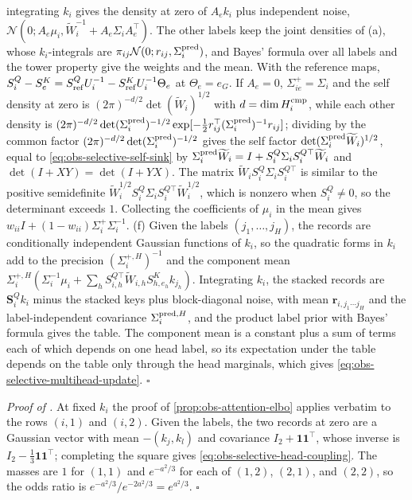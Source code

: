 integrating \(k_i\) gives the density at zero of \(A_ek_i\) plus independent
noise, \(\mathcal N(0;A_e\mu_i,\widetilde W_i^{-1}+A_e\Sigma_i A_e^\top)\). The
other labels keep the joint densities of (a), whose \(k_i\)-integrals are
\(\pi_{ij}\mathcal N(0;r_{ij},\Sigma_i^{\rm pred})\), and Bayes' formula over
all labels and the tower property give the weights and the mean. With the
reference maps, \(S^Q_i-S^K_e=S^Q_{\rm ref}U_i^{-1}-S^K_{\rm ref}U_i^{-1}\Theta_e\)
at \(\Theta_e=e_G\). If \(A_e=0\), \(\Sigma_{ie}^+=\Sigma_i\) and the self
density at zero is \((2\pi)^{-d/2}\det(\widetilde W_i)^{1/2}\) with
\(d=\dim H_i^{\rm cmp}\), while each other density is
\((2\pi)^{-d/2}\det(\Sigma_i^{\rm pred})^{-1/2}\exp[-\frac12r_{ij}^\top
(\Sigma_i^{\rm pred})^{-1}r_{ij}]\); dividing by the common factor
\((2\pi)^{-d/2}\det(\Sigma_i^{\rm pred})^{-1/2}\) gives the self factor
\(\det(\Sigma_i^{\rm pred}\widetilde W_i)^{1/2}\), equal to
\eqref{eq:obs-selective-self-sink} by
\(\Sigma_i^{\rm pred}\widetilde W_i=I+S^Q_i\Sigma_iS_i^{Q\top}\widetilde W_i\) and
\(\det(I+XY)=\det(I+YX)\). The matrix \(\widetilde W_iS^Q_i\Sigma_iS_i^{Q\top}\)
is similar to the positive semidefinite
\(\widetilde W_i^{1/2}S^Q_i\Sigma_iS_i^{Q\top}\widetilde W_i^{1/2}\), which is
nonzero when \(S^Q_i\ne0\), so the determinant exceeds \(1\). Collecting the
coefficients of \(\mu_i\) in the mean gives
\(w_{ii}I+(1-w_{ii})\Sigma_i^+\Sigma_i^{-1}\).
(f) Given the labels \((j_1,\ldots,j_H)\), the records are conditionally
independent Gaussian functions of \(k_i\), so the quadratic forms in \(k_i\)
add to the precision \((\Sigma_i^{+,H})^{-1}\) and the component mean
\(\Sigma_i^{+,H}(\Sigma_i^{-1}\mu_i+\sum_hS_{i,h}^{Q\top}\widetilde W_{i,h}
S^K_{h,e_h}k_{j_h})\). Integrating \(k_i\), the stacked records are
\(\mathbf S^Q_ik_i\) minus the stacked keys plus block-diagonal noise, with
mean \(\mathbf r_{i,j_1\cdots j_H}\) and the label-independent covariance
\(\Sigma_i^{{\rm pred},H}\), and the product label prior with Bayes' formula
gives the table. The component mean is a constant plus a sum of terms each of
which depends on one head label, so its expectation under the table depends on
the table only through the head marginals, which gives
\eqref{eq:obs-selective-multihead-update}. \(\square\)

\noindent\emph{Proof of .}
At fixed \(k_i\) the proof of \cref{prop:obs-attention-elbo} applies verbatim
to the rows \((i,1)\) and \((i,2)\). Given the labels, the two records at zero
are a Gaussian vector with mean \(-(k_j,k_l)\) and covariance
\(I_2+\mathbf 1\mathbf 1^\top\), whose inverse is
\(I_2-\frac13\mathbf 1\mathbf 1^\top\); completing the square gives
\eqref{eq:obs-selective-head-coupling}. The masses are \(1\) for \((1,1)\) and
\(e^{-a^2/3}\) for each of \((1,2)\), \((2,1)\), and \((2,2)\), so the odds
ratio is \(e^{-a^2/3}/e^{-2a^2/3}=e^{a^2/3}\). \(\square\)


